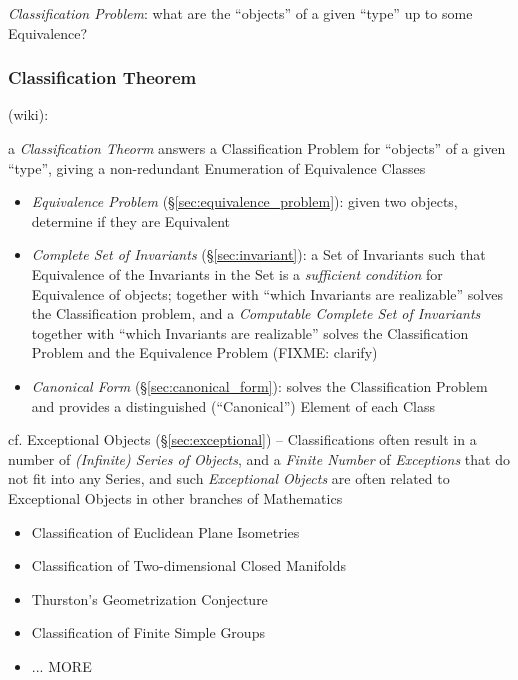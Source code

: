\emph{Classification Problem}: what are the ``objects'' of a given ``type'' up
to some Equivalence?



\subsubsection{Classification Theorem}\label{sec:classification_theorem}

(wiki):

a \emph{Classification Theorm} answers a Classification Problem for ``objects''
of a given ``type'', giving a non-redundant Enumeration of Equivalence Classes

\begin{itemize}
  \item \emph{Equivalence Problem} (\S\ref{sec:equivalence_problem}): given two
    objects, determine if they are Equivalent
  \item \emph{Complete Set of Invariants} (\S\ref{sec:invariant}): a Set of
    Invariants such that Equivalence of the Invariants in the Set is a
    \emph{sufficient condition} for Equivalence of objects; together with
    ``which Invariants are realizable'' solves the Classification problem, and a
    \emph{Computable Complete Set of Invariants} together with ``which
    Invariants are realizable'' solves the Classification Problem and the
    Equivalence Problem (FIXME: clarify)
  \item \emph{Canonical Form} (\S\ref{sec:canonical_form}): solves the
    Classification Problem and provides a distinguished (``Canonical'') Element
    of each Class
\end{itemize}

cf. Exceptional Objects (\S\ref{sec:exceptional}) -- Classifications often
result in a number of \emph{(Infinite) Series of Objects}, and a \emph{Finite
  Number} of \emph{Exceptions} that do not fit into any Series, and such
\emph{Exceptional Objects} are often related to Exceptional Objects in other
branches of Mathematics

\begin{itemize}
  \item Classification of Euclidean Plane Isometries
  \item Classification of Two-dimensional Closed Manifolds
  \item Thurston's Geometrization Conjecture
  \item Classification of Finite Simple Groups
  \item ... MORE
\end{itemize}

